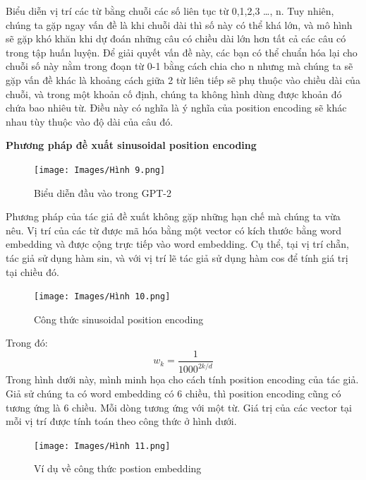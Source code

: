\documentclass[a4paper]{article}
\theoremstyle{definition}
\begin{document}
Biểu diễn vị trí các từ bằng chuỗi các số liên tục từ 0,1,2,3 …, n. Tuy nhiên, chúng ta gặp ngay vấn đề là khi chuỗi dài thì số này có thể khá lớn, và mô hình sẽ gặp khó khăn khi dự đoán những câu có chiều dài lớn hơn tất cả các câu có trong tập huấn luyện. Để giải quyết vấn đề này, các bạn có thể chuẩn hóa lại cho chuỗi số này nằm trong đoạn từ 0-1 bằng cách chia cho n nhưng mà chúng ta sẽ gặp vấn đề khác là khoảng cách giữa 2 từ liên tiếp sẽ phụ thuộc vào chiều dài của chuỗi, và trong một khoản cố định, chúng ta không hình dùng được khoản đó chứa bao nhiêu từ. Điều này có nghĩa là ý nghĩa của position encoding sẽ khác nhau tùy thuộc vào độ dài của câu đó.

\textbf{Phương pháp đề xuất sinusoidal position encoding} 

\begin{figure}[h!]
\begin{center}
\texttt{[image: Images/Hình 9.png]} \\[0.1in]

\caption{Biểu diễn đầu vào trong GPT-2}
\end{center}
\end{figure}
Phương pháp của tác giả đề xuất không gặp những hạn chế mà chúng ta vừa nêu. Vị trí của các từ được mã hóa bằng một vector có kích thước bằng word embedding và được cộng trực tiếp vào word embedding.
Cụ thể, tại vị trí chẵn, tác giả sử dụng hàm sin, và với vị trí lẽ tác giả sử dụng hàm cos để tính giá trị tại chiều đó.

\begin{figure}[h!]
\begin{center}
\texttt{[image: Images/Hình 10.png]} \\[0.1in]

\caption{Công thức sinusoidal position encoding}
\end{center}
\end{figure}
Trong đó:
$$w_k = \frac{1}{1000^{2k/d}}$$
Trong hình dưới này, mình minh họa cho cách tính position encoding của tác giả. Giả sử chúng ta có word embedding có 6 chiều, thì position encoding cũng có tương ứng là 6 chiều. Mỗi dòng tương ứng với một từ. Giá trị của các vector tại mỗi vị trí được tính toán theo công thức ở hình dưới.
\begin{figure}[h!]
\begin{center}
\texttt{[image: Images/Hình 11.png]} \\[0.25in]

\caption{Ví dụ về công thức postion embedding}
\end{center}
\end{figure}
\end{document}
